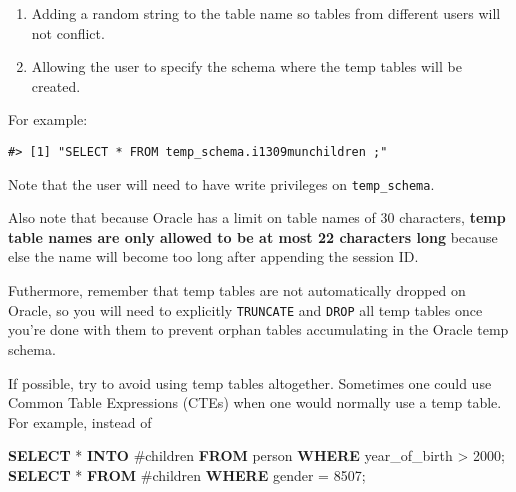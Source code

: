\documentclass[]{article}
\newenvironment{Shaded}{\begin{snugshade}}{\end{snugshade}}
\newcommand{\DataTypeTok}[1]{\textcolor[rgb]{0.13,0.29,0.53}{#1}}
\newcommand{\DecValTok}[1]{\textcolor[rgb]{0.00,0.00,0.81}{#1}}
\newcommand{\KeywordTok}[1]{\textcolor[rgb]{0.13,0.29,0.53}{\textbf{#1}}}
\newcommand{\NormalTok}[1]{#1}
\newcommand{\OperatorTok}[1]{\textcolor[rgb]{0.81,0.36,0.00}{\textbf{#1}}}
\newcommand{\StringTok}[1]{\textcolor[rgb]{0.31,0.60,0.02}{#1}}
\providecommand{\tightlist}{%
  \setlength{\itemsep}{0pt}\setlength{\parskip}{0pt}}
\begin{document}
\begin{enumerate}
\def\labelenumi{\arabic{enumi}.}
\tightlist
\item
  Adding a random string to the table name so tables from different
  users will not conflict.
\item
  Allowing the user to specify the schema where the temp tables will be
  created.
\end{enumerate}

For example:

\begin{Shaded}
\end{Shaded}

\begin{verbatim}
#> [1] "SELECT * FROM temp_schema.i1309munchildren ;"
\end{verbatim}

Note that the user will need to have write privileges on
\texttt{temp\_schema}.

Also note that because Oracle has a limit on table names of 30
characters, \textbf{temp table names are only allowed to be at most 22
characters long} because else the name will become too long after
appending the session ID.

Futhermore, remember that temp tables are not automatically dropped on
Oracle, so you will need to explicitly \texttt{TRUNCATE} and
\texttt{DROP} all temp tables once you're done with them to prevent
orphan tables accumulating in the Oracle temp schema.

If possible, try to avoid using temp tables altogether. Sometimes one
could use Common Table Expressions (CTEs) when one would normally use a
temp table. For example, instead of

\begin{Shaded}
\begin{Highlighting}[]
\KeywordTok{SELECT}\NormalTok{ * }\KeywordTok{INTO}\NormalTok{ #children }\KeywordTok{FROM}\NormalTok{ person }\KeywordTok{WHERE}\NormalTok{ year_of_birth > }\DecValTok{2000}\NormalTok{;}
\KeywordTok{SELECT}\NormalTok{ * }\KeywordTok{FROM}\NormalTok{ #children }\KeywordTok{WHERE}\NormalTok{ gender = }\DecValTok{8507}\NormalTok{;}
\end{Highlighting}
\end{Shaded}
\end{document}
